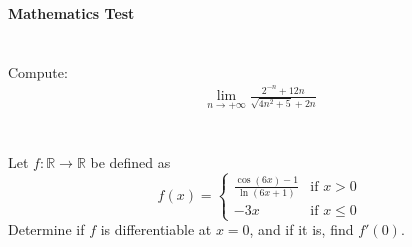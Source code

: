 \documentclass[12pt]{article}
\begin{document}
	
	\begin{center}
		\Large\textbf{Mathematics Test}
	\end{center}
	\vspace{1cm}
	
	\section*{}
	Compute:
	\begin{align*}
		\lim_{{n \to +\infty}} \frac{2^{-n} + 12n}{\sqrt{4n^2 + 5} + 2n}
	\end{align*}
	
	\section*{}
	Let \( f: \mathbb{R} \to \mathbb{R} \) be defined as
	\[
	f(x) = 
	\begin{cases} 
		\frac{\cos(6x) - 1}{\ln(6x+1)} & \text{if } x > 0 \\
		-3x & \text{if } x \leq 0 
	\end{cases}
	\]
	Determine if \( f \) is differentiable at \( x = 0 \), and if it is, find \( f'(0) \).
	
\end{document}
